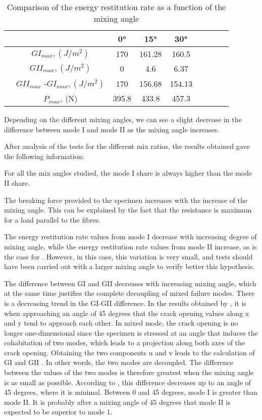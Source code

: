 \begin{table} [H]
	\centering
	\begin{tabular}{ccccccccc}
		\toprule %
		&  & 0° & 15° & 30° \\\midrule
		& $GI_{max}, (J/m^2)$ & 170 & 161.28 & 160.5  \\\midrule
		& $GII_{max}, (J/m^2)$ & 0 & 4.6 & 6.37 \\\midrule
		& $GII_{max}$ -$GI_{max}, (J/m^2)$ & 170 & 156.68 & 154.13 \\\midrule
		& $P_{max}$, (N) & 395.8 & 433.8 & 457.3 \\\midrule
	\end{tabular}
	\caption{Comparison of the energy restitution rate as a function of the mixing angle}
	\label{fig:Comparison_angle}
\end{table}

Depending on the different mixing angles, we can see a slight decrease in the difference between mode I and mode II as the mixing angle increases.

After analysis of the tests for the different mix ratios, the results obtained gave the following information:

For all the mix angles studied, the mode I share is always higher than the mode II share.

The breaking force provided to the specimen increases with the increase of the mixing angle. This can be explained by the fact that the resistance is maximum for a load parallel to the fibres.

The energy restitution rate values from mode I decrease with increasing degree of mixing angle, while the energy restitution rate values from mode II increase, as is the case for \cite{Odounga2018phd}. However, in this case, this variation is very small, and tests should have been carried out with a larger mixing angle to verify better this hypothesis.

The difference between GI and GII decreases with increasing mixing angle, which at the same time justifies the complete decoupling of mixed failure modes. There is a decreasing trend in the GI-GII difference. 
In the results obtained by \cite{Odounga2018phd}, it is when approaching an angle of 45 degrees that the crack opening values along x and y tend to approach each other. In mixed mode, the crack opening is no longer one-dimensional since the specimen is stressed at an angle that induces the cohabitation of two modes, which leads to a projection along both axes of the crack opening. Obtaining the two components u and v leads to the calculation of GI and GII . In other words, the two modes are decoupled. The difference between the values of the two modes is therefore greatest when the mixing angle is as small as possible. According to \cite{Odounga2018phd} , this difference decreases up to an angle of 45 degrees, where it is minimal. Between 0 and 45 degrees, mode I is greater than mode II. It is probably after a mixing angle of 45 degrees that mode II is expected to be superior to mode 1.

